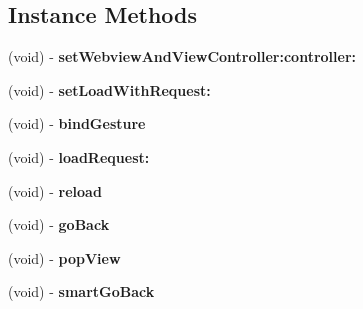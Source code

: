 \subsection*{Instance Methods}
\begin{DoxyCompactItemize}
\item 
\mbox{\label{interface_alibc_u_r_l_bus_context_aa8ea10f760fc39007a39d6e8b11167e2}} 
(void) -\/ {\bfseries set\+Webview\+And\+View\+Controller\+:controller\+:}
\item 
\mbox{\label{interface_alibc_u_r_l_bus_context_a4f9ab1de2de7a6fa5235da90d5bc8161}} 
(void) -\/ {\bfseries set\+Load\+With\+Request\+:}
\item 
\mbox{\label{interface_alibc_u_r_l_bus_context_ac7ede209321b78ba946e0a699c1c108e}} 
(void) -\/ {\bfseries bind\+Gesture}
\item 
\mbox{\label{interface_alibc_u_r_l_bus_context_a42385b4d36278d79a84b979be24585aa}} 
(void) -\/ {\bfseries load\+Request\+:}
\item 
\mbox{\label{interface_alibc_u_r_l_bus_context_a5f02524fd5294677b6899e5941c04846}} 
(void) -\/ {\bfseries reload}
\item 
\mbox{\label{interface_alibc_u_r_l_bus_context_a7b9f0c255fdb179acf9b1593af9dc128}} 
(void) -\/ {\bfseries go\+Back}
\item 
\mbox{\label{interface_alibc_u_r_l_bus_context_a233e9985c461fd3f7318fd96ee0c232c}} 
(void) -\/ {\bfseries pop\+View}
\item 
\mbox{\label{interface_alibc_u_r_l_bus_context_a88dddb045c0750c0f316d41e7f22e664}} 
(void) -\/ {\bfseries smart\+Go\+Back}
\end{DoxyCompactItemize}
